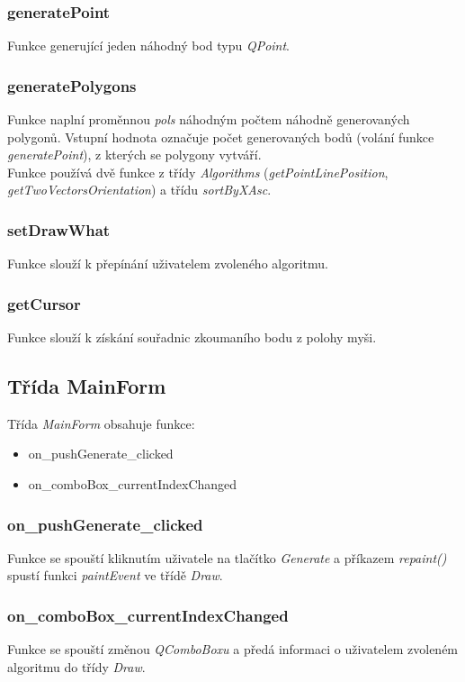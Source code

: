 \documentclass{article}
\begin{document}
\subsubsection{generatePoint}
Funkce generující jeden náhodný bod typu\emph{ QPoint}.

\subsubsection{generatePolygons}
Funkce naplní proměnnou \emph{pols} náhodným počtem náhodně generovaných polygonů. Vstupní hodnota označuje počet generovaných bodů (volání funkce \emph{generatePoint}), z kterých se polygony vytváří.\\
Funkce používá dvě funkce z třídy \emph{Algorithms} (\emph{getPointLinePosition}, \emph{getTwoVectorsOrientation}) a třídu \emph{sortByXAsc}. 

\subsubsection{setDrawWhat}
Funkce slouží k přepínání uživatelem zvoleného algoritmu.

\subsubsection{getCursor}
Funkce slouží k získání souřadnic zkoumaního bodu z polohy myši.

\subsection{Třída MainForm}
Třída \emph{MainForm} obsahuje funkce:
\begin{itemize}
\item on\_pushGenerate\_clicked
\item on\_comboBox\_currentIndexChanged
\end{itemize}

\subsubsection{on\_pushGenerate\_clicked}
Funkce se spouští kliknutím uživatele na tlačítko \emph{Generate} a příkazem \emph{repaint()} spustí funkci \emph{paintEvent} ve třídě \emph{Draw}.

\subsubsection{on\_comboBox\_currentIndexChanged}
Funkce se spouští změnou \emph{QComboBoxu} a předá informaci o uživatelem zvoleném algoritmu do třídy \emph{Draw}.
\end{document}
